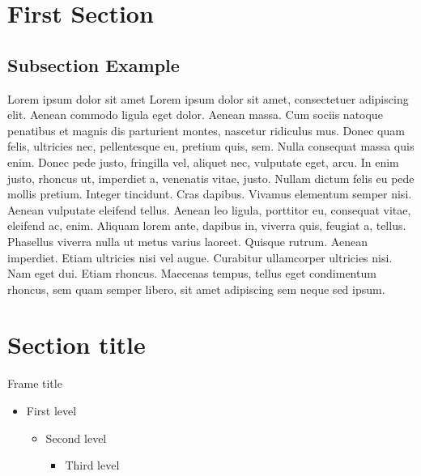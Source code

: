 \section{First Section} %

\subsection{Subsection Example} %


\begin{frame}{Lorem ipsum dolor sit amet}
    Lorem ipsum dolor sit amet, consectetuer adipiscing elit. Aenean commodo ligula eget dolor. Aenean massa. Cum sociis natoque penatibus et magnis dis parturient montes, nascetur ridiculus mus. Donec quam felis, ultricies nec, pellentesque eu, pretium quis, sem. Nulla consequat massa quis enim. Donec pede justo, fringilla vel, aliquet nec, vulputate eget, arcu. In enim justo, rhoncus ut, imperdiet a, venenatis vitae, justo. Nullam dictum felis eu pede mollis pretium. Integer tincidunt. Cras dapibus. Vivamus elementum semper nisi. Aenean vulputate eleifend tellus. Aenean leo ligula, porttitor eu, consequat vitae, eleifend ac, enim. Aliquam lorem ante, dapibus in, viverra quis, feugiat a, tellus. Phasellus viverra nulla ut metus varius laoreet. Quisque rutrum. Aenean imperdiet. Etiam ultricies nisi vel augue. Curabitur ullamcorper ultricies nisi. Nam eget dui. Etiam rhoncus. Maecenas tempus, tellus eget condimentum rhoncus, sem quam semper libero, sit amet adipiscing sem neque sed ipsum.
\end{frame}


\section{Section title}

\begin{frame}{Frame title}
  \begin{itemize}
    \item First level
    \begin{itemize}
      \item Second level
      \begin{itemize}
      \item Third level
    \end{itemize}
  \end{itemize}
\end{itemize}
\end{frame}

